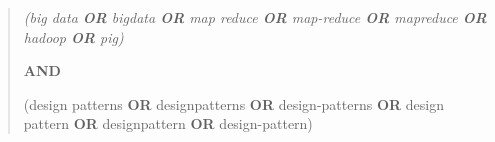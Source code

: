 \begin{quote} \sl
\qquad  (big data \textbf{OR} bigdata \textbf{OR} map reduce \textbf{OR}
map-reduce \textbf{OR} mapreduce \textbf{OR} hadoop \textbf{OR} pig)

\textbf{AND}

\qquad (design patterns \textbf{OR} designpatterns \textbf{OR}
design-patterns \textbf{OR} design pattern
\textbf{OR} designpattern \textbf{OR} design-pattern)
\end{quote}